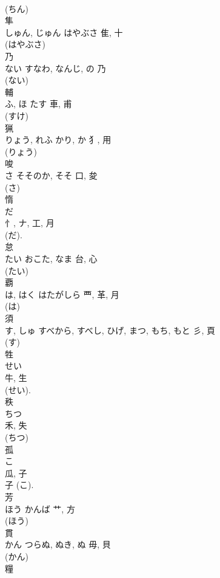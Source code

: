 \documentclass[8pt]{extreport}
\begin{document}
\begin{CJK}{UTF8}{min}
\\	(ちん) 
\\	隼	
\\	しゅん, じゅん	はやぶさ	隹, 十	
\\	(はやぶさ) 
\\	乃	
\\	ない	すなわ, なんじ, の	乃	
\\	(ない) 
\\	輔	
\\	ふ, ほ	たす	車, 甫	
\\	(すけ) 
\\	猟	
\\	りょう, れふ	かり, か	犭, 用		
\\	(りょう) 
\\	唆	
\\	さ	そそのか, そそ	口, 夋	
\\	(さ) 
\\	惰	
\\	だ	
\\	忄, ナ, 工, 月	
\\	(だ). 
\\	怠	
\\	たい	おこた, なま	台, 心	
\\	(たい) 
\\	覇	
\\	は, はく	はたがしら	覀, 革, 月	
\\	(は) 
\\	須	
\\	す, しゅ	すべから, すべし, ひげ, まつ, もち, もと	彡, 頁	
\\	(す) 
\\	牲	
\\	せい	
\\	牛, 生	
\\	(せい). 
\\	秩	
\\	ちつ	
\\	禾, 失	
\\	(ちつ) 
\\	孤	
\\	こ	
\\	瓜, 子	
\\	子 (こ).	
\\	芳	
\\	ほう	かんば	艹, 方	
\\	(ほう) 
\\	貫	
\\	かん	つらぬ, ぬき, ぬ	毋, 貝	
\\	(かん) 
\\	糧	

\end{CJK}
\end{document}
